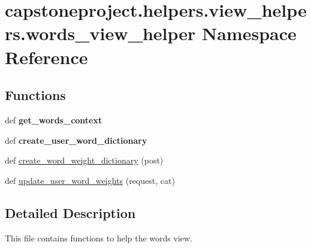 \hypertarget{namespacecapstoneproject_1_1helpers_1_1view__helpers_1_1words__view__helper}{}\section{capstoneproject.\+helpers.\+view\+\_\+helpers.\+words\+\_\+view\+\_\+helper Namespace Reference}
\label{namespacecapstoneproject_1_1helpers_1_1view__helpers_1_1words__view__helper}
\subsection*{Functions}
\begin{DoxyCompactItemize}
\item 
\mbox{\label{namespacecapstoneproject_1_1helpers_1_1view__helpers_1_1words__view__helper_a2bc61b55517c3ea1b6e3089184abc23c}} 
def {\bfseries get\+\_\+words\+\_\+context}
\item 
\mbox{\label{namespacecapstoneproject_1_1helpers_1_1view__helpers_1_1words__view__helper_ac5bf0c5c569025d897867cdf370dbc3a}} 
def {\bfseries create\+\_\+user\+\_\+word\+\_\+dictionary}
\item 
def \mbox{\hyperlink{namespacecapstoneproject_1_1helpers_1_1view__helpers_1_1words__view__helper_a362c0ecf28b7a5716290e719e527af6a}{create\+\_\+word\+\_\+weight\+\_\+dictionary}} (post)
\item 
def \mbox{\hyperlink{namespacecapstoneproject_1_1helpers_1_1view__helpers_1_1words__view__helper_a50ed50e19563f60d831edbac4f876f0a}{update\+\_\+user\+\_\+word\+\_\+weights}} (request, cat)
\end{DoxyCompactItemize}


\subsection{Detailed Description}
\begin{DoxyVerb}This file contains functions to help the words view.
\end{DoxyVerb}
 

